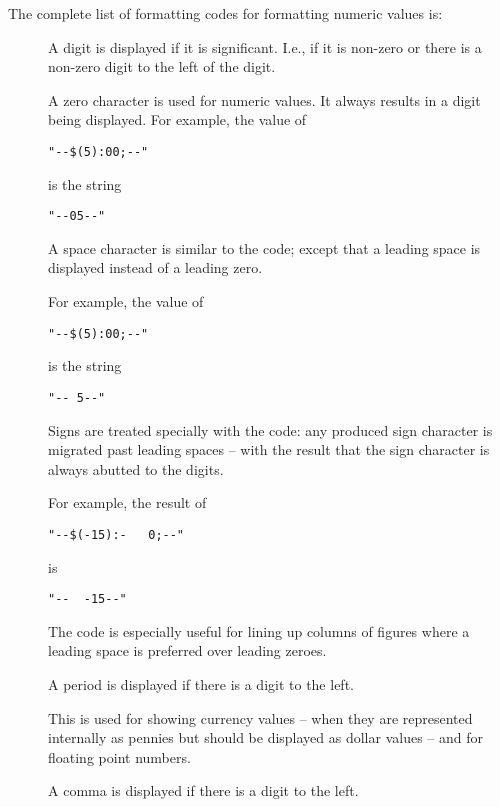 The complete list of formatting codes for formatting numeric values is:

\begin{description}
\item[] A digit is displayed if it is significant. I.e., if it is non-zero or there is a non-zero digit to the left of the digit.
\item[] A zero character is used for numeric values. It always results in a digit being displayed. For example, the value of
\begin{lstlisting}
"--$(5):00;--"
\end{lstlisting}
is the string
\begin{lstlisting}
"--05--"
\end{lstlisting}

\item[\q{\spce{}}] A space character is similar to the  code; except that a leading space is displayed instead of a leading zero. 

For example, the value of
\begin{lstlisting}
"--$(5):00;--"
\end{lstlisting}
is the string
\begin{lstlisting}
"-- 5--"
\end{lstlisting}

\begin{aside}
Signs are treated specially with the \q{\spce{}} code: any produced sign character is migrated past leading spaces -- with the result that the sign character is always abutted to the digits.

For example, the result of
\begin{lstlisting}
"--$(-15):-   0;--"
\end{lstlisting}
is
\begin{lstlisting}
"--  -15--"
\end{lstlisting}
The \q{\spce{}} code is especially useful for lining up columns of figures where a leading space is preferred over leading zeroes.
\end{aside}

\item[] A period is displayed if there is a digit to the left.

This is used for showing currency values -- when they are represented internally as pennies but should be displayed as dollar values -- and for floating point numbers.
\item[\q{,}] A comma is displayed if there is a digit to the left. 


\end{description}
